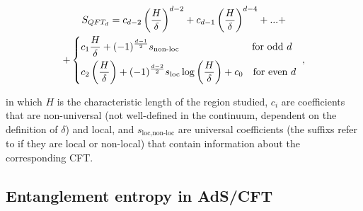\documentclass[lettersize,journal]{IEEEtran}
\providecommand{\eq}[2]{
    \begin{equation}
        #2
    \label{eq:#1}
    \end{equation}
}
\providecommand{\eqgat}[2]{
    \begin{gather}
        #2
    \label{eq:#1}
    \end{gather}
}
\begin{document}
\eqgat{EE}{
    S_{QFT_d} = c_{d-2} \left( \frac{H}{\delta} \right) ^{d-2} + c_{d-1} \left( \frac{H}{\delta} \right) ^{d-4} + ... + \nonumber \\
    + \begin{dcases}
        c_1 \frac{H}{\delta} + (-1)^{\frac{d-1}{2}} s_{\text{non-loc}}
        \qquad \qquad \qquad \quad \ \text{for odd } d \\
        c_2 \left ( \frac{H}{\delta} \right ) + (-1)^{\frac{d-2}{2}} s_{\text{loc}} \log \left ( \frac{H}{\delta} \right ) + c_0
        \quad \text{for even } d
    \end{dcases} \ ,
}
\cite{nishioka_entanglement_2018} in which $H$ is the characteristic length of the region studied, $c_i$ are coefficients that are non-universal (not well-defined in the continuum, dependent on the definition of $\delta$) and local, and $s_{\text{loc},\text{non-loc}}$ are universal coefficients (the suffixs refer to if they are local or non-local) that contain information about the corresponding CFT.


\subsection{Entanglement entropy in AdS/CFT} \label{ss:EE_AdS/CFT}
\end{document}
